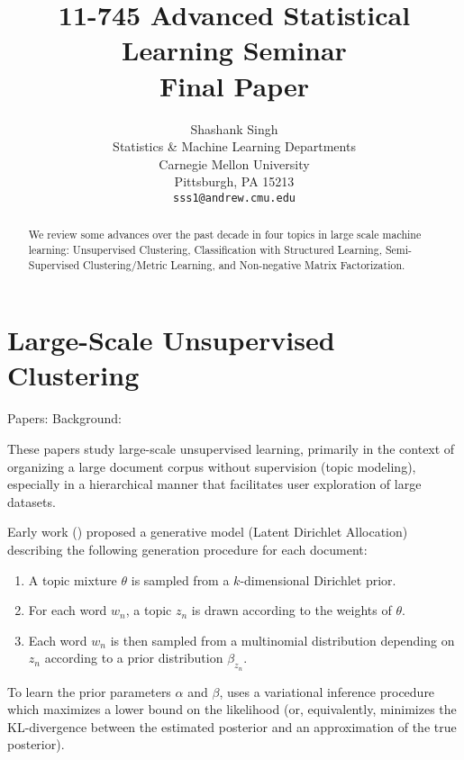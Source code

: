 \documentclass{article} %
\title{11-745 Advanced Statistical Learning Seminar\\Final Paper}
\author{
Shashank Singh \\
Statistics \& Machine Learning Departments \\
Carnegie Mellon University \\
Pittsburgh, PA 15213 \\
\texttt{sss1@andrew.cmu.edu} \\
}
\begin{document}
\maketitle

\begin{abstract}
We review some advances over the past decade in four topics in large scale
machine learning: Unsupervised Clustering, Classification with Structured
Learning, Semi-Supervised Clustering/Metric Learning, and Non-negative Matrix
Factorization.
\end{abstract}

% 
\section{Large-Scale Unsupervised Clustering}
Papers:
    \cite{gopal14VMF,
          banerjee05VMF,
          blei03LDA}
\quad
Background:
          \cite{bishop06machinelearning}

These papers study large-scale unsupervised learning, primarily in the context
of organizing a large document corpus without supervision (topic modeling),
especially in a hierarchical manner that facilitates user exploration of large
datasets.

Early work (\cite{blei03LDA}) proposed a generative model (Latent Dirichlet
Allocation) describing the following generation procedure for each document:
\begin{enumerate}
\item A topic mixture $\theta$ is sampled from a $k$-dimensional Dirichlet
prior.
\item For each word $w_n$, a topic $z_n$ is drawn according to the weights of
$\theta$.
\item Each word $w_n$ is then sampled from a multinomial distribution
depending on $z_n$ according to a prior distribution $\beta_{z_n}$.
\end{enumerate}
To learn the prior parameters $\alpha$ and $\beta$, \cite{blei03LDA} uses a
variational inference procedure which maximizes a lower bound on the likelihood
(or, equivalently, minimizes the KL-divergence between the estimated posterior
and an approximation of the true posterior).
\end{document}
